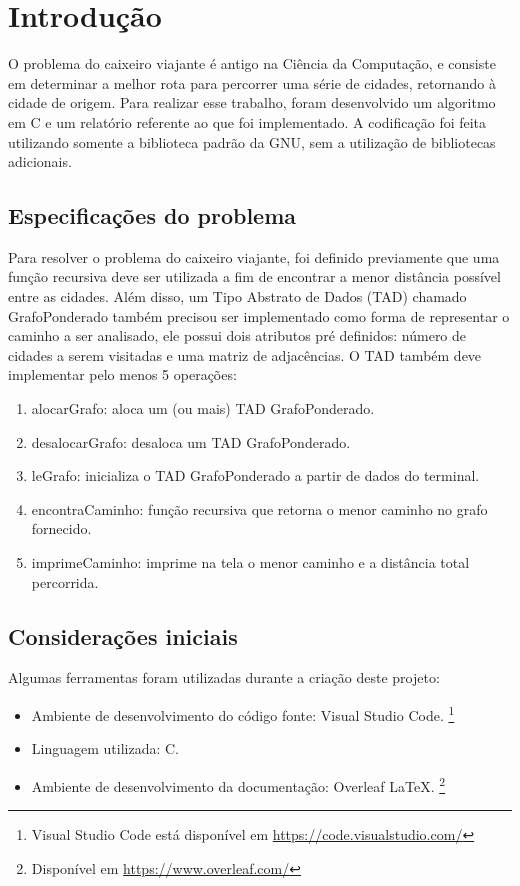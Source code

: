 \documentclass{article}
\begin{document}

\section{Introdução}
O problema do caixeiro viajante é antigo na Ciência da Computação, e consiste em determinar a melhor rota para percorrer uma série de cidades, retornando à cidade de origem. Para realizar esse trabalho, foram desenvolvido um algoritmo em C e um relatório referente ao que foi implementado. A codificação foi feita utilizando somente a biblioteca padrão da GNU, sem a utilização de bibliotecas adicionais.

\subsection{Especificações do problema}
Para resolver o problema do caixeiro viajante, foi definido previamente que uma função recursiva deve ser utilizada a fim de encontrar a menor distância possível entre as cidades. Além disso, um Tipo Abstrato de Dados (TAD) chamado GrafoPonderado também precisou ser implementado como forma de representar o caminho a ser analisado, ele possui dois atributos pré definidos: número de cidades a serem visitadas e uma matriz de adjacências. O TAD também deve implementar pelo menos 5 operações: 
\begin{enumerate}
    \item alocarGrafo: aloca um (ou mais) TAD GrafoPonderado.
    \item desalocarGrafo: desaloca um TAD GrafoPonderado.
    \item leGrafo: inicializa o TAD GrafoPonderado a partir de dados do terminal.
    \item encontraCaminho: função recursiva que retorna o menor caminho no grafo fornecido.
    \item imprimeCaminho: imprime na tela o menor caminho e a distância total percorrida.
\end{enumerate}


\subsection{Considerações iniciais}

Algumas ferramentas foram utilizadas durante a criação deste projeto:

\begin{itemize}
  \item Ambiente de desenvolvimento do código fonte: Visual Studio Code. \footnote{Visual Studio Code está disponível em \url{https://code.visualstudio.com/}}
  \item Linguagem utilizada: C.
  \item Ambiente de desenvolvimento da documentação: Overleaf \LaTeX. \footnote{Disponível em \url{https://www.overleaf.com/}}
\end{itemize}
\end{document}
